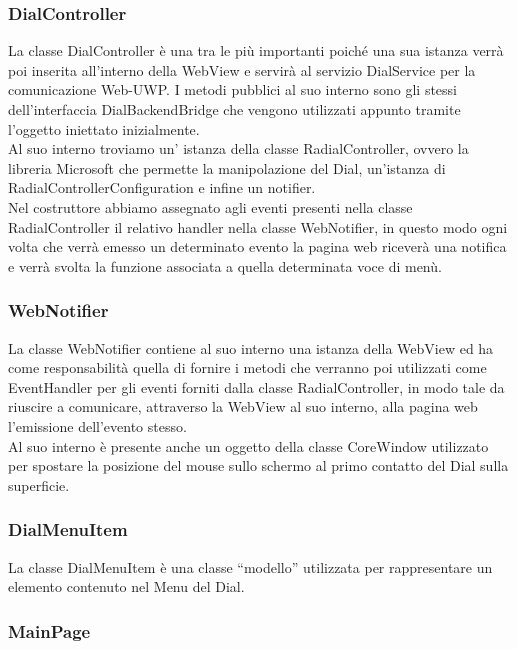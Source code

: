 \subsubsection{DialController}

La classe DialController è una tra le più importanti poiché una sua istanza verrà poi inserita all’interno della WebView e servirà al servizio DialService per la comunicazione Web-UWP. I metodi pubblici al suo interno sono gli stessi dell’interfaccia DialBackendBridge che vengono utilizzati appunto tramite l’oggetto iniettato inizialmente.\\

Al suo interno troviamo un’ istanza della classe RadialController, ovvero la libreria Microsoft che permette la manipolazione del Dial, un'istanza di RadialControllerConfiguration e infine un notifier.\\

Nel costruttore abbiamo assegnato agli eventi presenti nella classe RadialController il relativo handler nella classe WebNotifier, in questo modo ogni volta che verrà emesso un determinato evento la pagina web riceverà una notifica e verrà svolta la funzione associata a quella determinata voce di menù.

\subsubsection{WebNotifier}

La classe WebNotifier contiene al suo interno una istanza della WebView ed ha come responsabilità quella di fornire i metodi che verranno poi utilizzati come EventHandler per gli eventi forniti dalla classe RadialController, in modo tale da riuscire a comunicare, attraverso la WebView al suo interno, alla pagina web l’emissione dell’evento stesso.\\

Al suo interno è presente anche un oggetto della classe CoreWindow utilizzato per spostare la posizione del mouse sullo schermo al primo contatto del Dial sulla superficie.

\subsubsection{DialMenuItem}

La classe DialMenuItem è una classe “modello” utilizzata per rappresentare un elemento contenuto nel Menu del Dial.

\subsubsection{MainPage}

